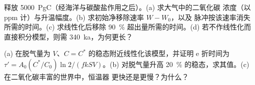 \begin{exercise}[$\star\star\star$]\label{exo:b2:deep-time-climate:11}
释放 \qty{5000}{PgC}（经海洋与碳酸盐作用之后）。(a) 求大气中的二氧化碳
浓度（以 ppm 计）与升温幅度。(b) 求初始净移除速率 $W - W_0$，以及
脉冲按该速率消失所需的时间。(c) 求线性化后移除 \qty{90}{\percent}
超出量所需的时间。(d) 若不作线性化而直接积分模型，则需 \qty{340}{ka}，为何更长？
\end{exercise}

\begin{exercise}[$\star\star\star$]\label{exo:b2:deep-time-climate:12}
(a) 在脱气量为 $V$、$C = C^*$ 的稳态附近线性化该模型，并证明
e 折时间为 $\tau' = A_0 (C^*/C_0)\ln 2/(f k S V)$。(b) 对脱气量升高
\qty{20}{\percent} 的稳态，求其值。(c) 在二氧化碳丰富的世界中，恒温器
更快还是更慢？为什么？
\end{exercise}

